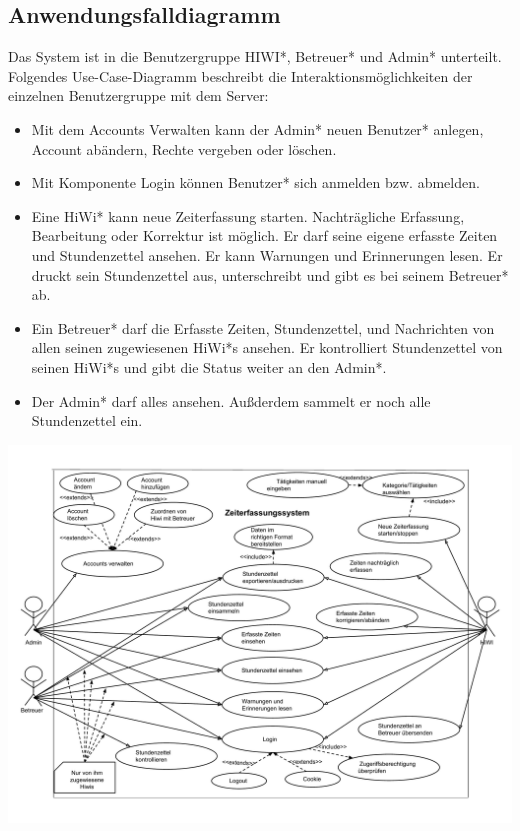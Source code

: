 \newpage
\subsection{Anwendungsfalldiagramm}
Das System ist in die Benutzergruppe HIWI*, Betreuer* und Admin* unterteilt. Folgendes Use-Case-Diagramm beschreibt die Interaktionsmöglichkeiten der einzelnen Benutzergruppe mit dem Server:
\begin{itemize}
	\item Mit dem Accounts Verwalten kann der Admin* neuen Benutzer* anlegen, Account abändern, Rechte vergeben oder löschen.
	\item Mit Komponente Login können Benutzer* sich anmelden bzw. abmelden.
	\item Eine HiWi* kann neue Zeiterfassung starten. Nachträgliche Erfassung, Bearbeitung oder Korrektur ist möglich. Er darf seine eigene erfasste Zeiten und Stundenzettel ansehen. Er kann Warnungen und Erinnerungen lesen. Er druckt sein Stundenzettel aus, unterschreibt und gibt es bei seinem Betreuer* ab.
	\item Ein Betreuer* darf die Erfasste Zeiten, Stundenzettel, und Nachrichten von allen seinen zugewiesenen HiWi*s ansehen. Er kontrolliert Stundenzettel von seinen HiWi*s und gibt die Status weiter an den Admin*.
	\item Der Admin* darf alles ansehen. Außderdem sammelt er noch alle Stundenzettel ein.
\end{itemize}


\includegraphics[width=\linewidth]{Anwendungsfalldiagramm.pdf}\\
